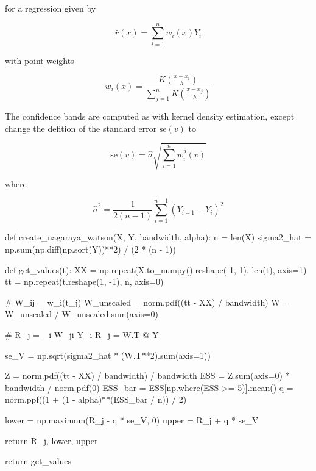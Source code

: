 for a regression given by

\[ \hat{r}(x) = \sum_{i=1}^n w_i(x) Y_i \]

with point weights

\[ w_i(x) = \frac{K\left( \frac{x - x_i}{h} \right)}{\sum_{j=1}^n K\left( \frac{x - x_j}{h} \right)} \]

The confidence bands are computed as with kernel density estimation,
except change the defition of the standard error \(\text{se}(v)\) to

\[ \text{se}(v) = \hat{\sigma} \sqrt{\sum_{i=1}^n w^2_i(v)} \]

where

\[ \hat{\sigma}^2 = \frac{1}{2(n - 1)} \sum_{i=1}^{n-1} (Y_{i+1} - Y_i)^2\]

\begin{python}
def create_nagaraya_watson(X, Y, bandwidth, alpha):
    n = len(X)
    sigma2_hat = np.sum(np.diff(np.sort(Y))**2) / (2 * (n - 1))
    
    def get_values(t):
        XX = np.repeat(X.to_numpy().reshape(-1, 1), len(t), axis=1)
        tt = np.repeat(t.reshape(1, -1), n, axis=0)
        
        # W_ij = w_i(t_j)
        W_unscaled = norm.pdf((tt - XX) / bandwidth) 
        W = W_unscaled / W_unscaled.sum(axis=0)
        
        # R_j = \sum_i W_ji Y_i
        R_j = W.T @ Y
        
        se_V = np.sqrt(sigma2_hat * (W.T**2).sum(axis=1))
        
        Z = norm.pdf((tt - XX) / bandwidth) / bandwidth
        ESS = Z.sum(axis=0) * bandwidth / norm.pdf(0)
        ESS_bar = ESS[np.where(ESS >= 5)].mean()
        q = norm.ppf((1 + (1 - alpha)**(ESS_bar / n)) / 2)
        
        lower = np.maximum(R_j - q * se_V, 0)
        upper = R_j + q * se_V
        
        return R_j, lower, upper
        
    return get_values
\end{python}

